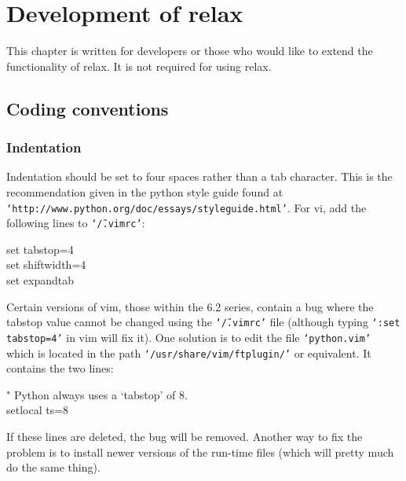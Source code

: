 
\chapter{Development of relax}

This chapter is written for developers or those who would like to extend the functionality of relax.  It is not required for using relax.




\section{Coding conventions}


\subsection{Indentation}

Indentation should be set to four spaces rather than a tab character.  This is the recommendation given in the python style guide found at \texttt{`http://www.python.org/doc/essays/styleguide.html'}.  For vi, add the following lines to \texttt{`\~/.vimrc'}:

\begin{exampleenv}
set tabstop=4 \\
set shiftwidth=4 \\
set expandtab
\end{exampleenv}

Certain versions of vim, those within the 6.2 series, contain a bug where the tabstop value cannot be changed using the \texttt{`\~/.vimrc'} file (although typing \texttt{`:set tabstop=4'} in vim will fix it).  One solution is to edit the file \texttt{`python.vim'} which is located in the path \texttt{`/usr/share/vim/ftplugin/'} or equivalent. It contains the two lines:

\begin{exampleenv}
" Python always uses a `tabstop' of 8. \\
setlocal ts=8
\end{exampleenv}

If these lines are deleted, the bug will be removed.  Another way to fix the problem is to install newer versions of the run-time files (which will pretty much do the same thing).


